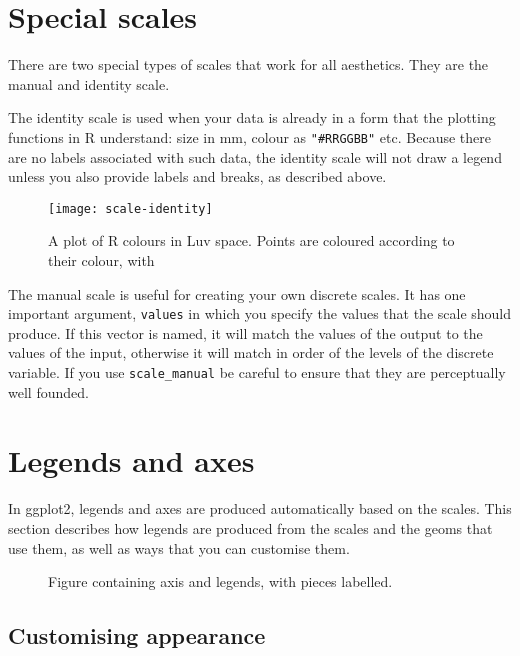 \section{Special scales}
\label{sec:scale_special}

There are two special types of scales that work for all aesthetics.  They are the manual and identity scale.  

The identity scale is used when your data is already in a form that the plotting functions in R understand: size in mm, colour as \verb|"#RRGGBB"| etc. Because there are no labels associated with such data, the identity scale will not draw a legend unless you also provide labels and breaks, as described above. 

\begin{figure}[htbp]
  \centering
    \texttt{[image: scale-identity]}
  \caption{A plot of R colours in Luv space.  Points are coloured according to their colour, with }
  \label{fig:scale-identity}
\end{figure}

The manual scale is useful for creating your own discrete scales.  It has one important argument, \verb|values| in which you specify the values that the scale should produce.  If this vector is named, it will match the values of the output to the values of the input, otherwise it will match in order of the levels of the discrete variable.  If you use \verb|scale_manual| be careful to ensure that they are perceptually well founded.


\section{Legends and axes}
\label{sec:legends_and_axes}

In ggplot2, legends and axes are produced automatically based on the scales.  This section describes how legends are produced from the scales and the geoms that use them, as well as ways that you can customise them.

\begin{figure}[htbp]
  \centering
  \caption{Figure containing axis and legends, with pieces labelled.}
  \label{fig:label}
\end{figure}

\subsection{Customising appearance}

